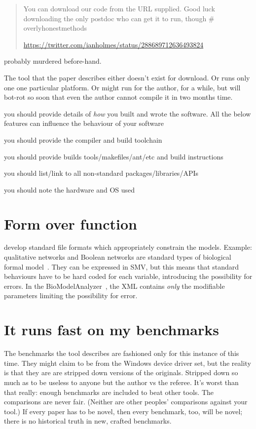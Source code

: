 \documentclass[conference]{IEEEtran}
\begin{document}
\begin{quote}
You can download our code from the URL supplied. Good luck downloading the only postdoc who can get it to run, though \# overlyhonestmethods

\url{https://twitter.com/ianholmes/status/288689712636493824} 
\end{quote}


probably murdered before-hand. 

The tool that the paper describes either doesn't exist for
download. Or runs only one one particular platform. Or might run for
the author, for a while, but will bot-rot so soon that even the author
cannot compile it in two months time.



you should provide details of \emph{how} you built and wrote the software. All the below features can influence the behaviour of your software

you should provide the compiler and build toolchain

you should provide builds tools/makefiles/ant/etc and build instructions

you should list/link to all non-standard packages/libraries/APIs

you should note the hardware and OS used


\section{Form over function}

develop standard file formats which appropriately constrain the
models. Example: qualitative networks and Boolean networks are
standard types of biological formal
model~\cite{Kauffman1969,Schaub2007}. They can be expressed in SMV,
but this means that standard behaviours have to be hard coded for each
variable, introducing the possibility for errors. In the
BioModelAnalyzer~\cite{Benque2012}, the XML contains \emph{only} the
modifiable parameters limiting the possibility for error.


\section{It runs fast on my benchmarks} 

The benchmarks the tool describes are fashioned only for this instance
of this time. They might claim to be from the Windows device driver
set, but the reality is that they are are stripped down versions of
the originals. Stripped down so much as to be useless to anyone but
the author vs the referee. It's worst than that really: enough
benchmarks are included to beat other tools. The comparisons are never
fair. (Neither are other peoples' comparisons against your tool.) If
every paper has to be novel, then every benchmark, too, will be novel;
there is no historical truth in new, crafted benchmarks.
\end{document}

